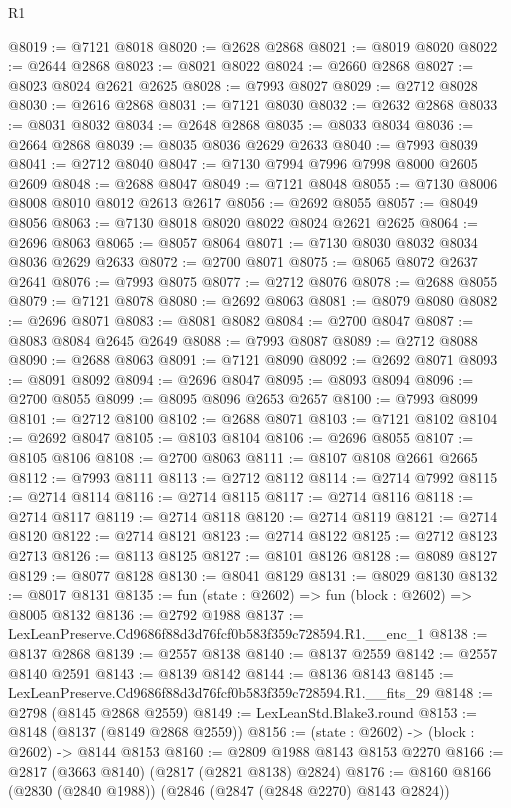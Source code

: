 \begin{lexlean}{R1}
\begin{coremodule}
@8019 := @7121 @8018
@8020 := @2628 @2868
@8021 := @8019 @8020
@8022 := @2644 @2868
@8023 := @8021 @8022
@8024 := @2660 @2868
@8027 := @8023 @8024 @2621 @2625
@8028 := @7993 @8027
@8029 := @2712 @8028
@8030 := @2616 @2868
@8031 := @7121 @8030
@8032 := @2632 @2868
@8033 := @8031 @8032
@8034 := @2648 @2868
@8035 := @8033 @8034
@8036 := @2664 @2868
@8039 := @8035 @8036 @2629 @2633
@8040 := @7993 @8039
@8041 := @2712 @8040
@8047 := @7130 @7994 @7996 @7998 @8000 @2605 @2609
@8048 := @2688 @8047
@8049 := @7121 @8048
@8055 := @7130 @8006 @8008 @8010 @8012 @2613 @2617
@8056 := @2692 @8055
@8057 := @8049 @8056
@8063 := @7130 @8018 @8020 @8022 @8024 @2621 @2625
@8064 := @2696 @8063
@8065 := @8057 @8064
@8071 := @7130 @8030 @8032 @8034 @8036 @2629 @2633
@8072 := @2700 @8071
@8075 := @8065 @8072 @2637 @2641
@8076 := @7993 @8075
@8077 := @2712 @8076
@8078 := @2688 @8055
@8079 := @7121 @8078
@8080 := @2692 @8063
@8081 := @8079 @8080
@8082 := @2696 @8071
@8083 := @8081 @8082
@8084 := @2700 @8047
@8087 := @8083 @8084 @2645 @2649
@8088 := @7993 @8087
@8089 := @2712 @8088
@8090 := @2688 @8063
@8091 := @7121 @8090
@8092 := @2692 @8071
@8093 := @8091 @8092
@8094 := @2696 @8047
@8095 := @8093 @8094
@8096 := @2700 @8055
@8099 := @8095 @8096 @2653 @2657
@8100 := @7993 @8099
@8101 := @2712 @8100
@8102 := @2688 @8071
@8103 := @7121 @8102
@8104 := @2692 @8047
@8105 := @8103 @8104
@8106 := @2696 @8055
@8107 := @8105 @8106
@8108 := @2700 @8063
@8111 := @8107 @8108 @2661 @2665
@8112 := @7993 @8111
@8113 := @2712 @8112
@8114 := @2714 @7992
@8115 := @2714 @8114
@8116 := @2714 @8115
@8117 := @2714 @8116
@8118 := @2714 @8117
@8119 := @2714 @8118
@8120 := @2714 @8119
@8121 := @2714 @8120
@8122 := @2714 @8121
@8123 := @2714 @8122
@8125 := @2712 @8123 @2713
@8126 := @8113 @8125
@8127 := @8101 @8126
@8128 := @8089 @8127
@8129 := @8077 @8128
@8130 := @8041 @8129
@8131 := @8029 @8130
@8132 := @8017 @8131
@8135 := fun (state : @2602) => fun (block : @2602) => @8005 @8132
@8136 := @2792 @1988
@8137 := LexLeanPreserve.Cd9686f88d3d76fcf0b583f359c728594.R1.__enc_1
@8138 := @8137 @2868
@8139 := @2557 @8138
@8140 := @8137 @2559
@8142 := @2557 @8140 @2591
@8143 := @8139 @8142
@8144 := @8136 @8143
@8145 := LexLeanPreserve.Cd9686f88d3d76fcf0b583f359c728594.R1.__fits_29
@8148 := @2798 (@8145 @2868 @2559)
@8149 := LexLeanStd.Blake3.round
@8153 := @8148 (@8137 (@8149 @2868 @2559))
@8156 := (state : @2602) -> (block : @2602) -> @8144 @8153
@8160 := @2809 @1988 @8143 @8153 @2270
@8166 := @2817 (@3663 @8140) (@2817 (@2821 @8138) @2824)
@8176 := @8160 @8166 (@2830 (@2840 @1988)) (@2846 (@2847 (@2848 @2270) @8143 @2824))

\end{coremodule}
\end{lexlean}
